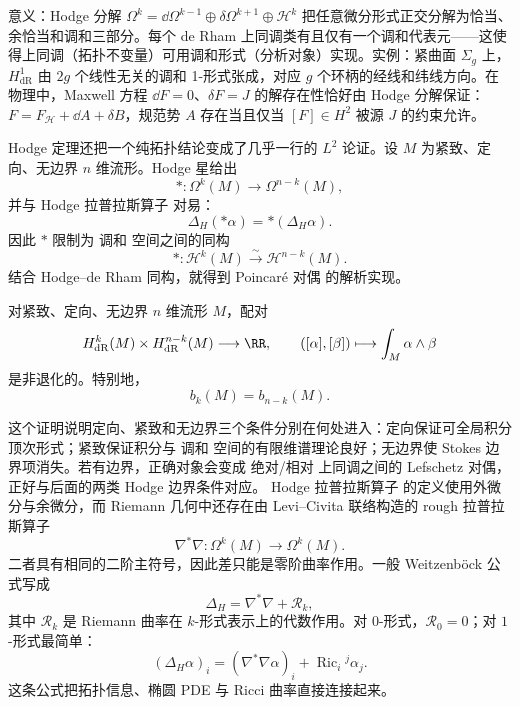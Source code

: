 意义：Hodge 分解 $\Omega^k=\dd\Omega^{k-1}\oplus\delta\Omega^{k+1}\oplus\mathcal H^k$ 把任意微分形式正交分解为恰当、余恰当和调和三部分。每个 de Rham 上同调类有且仅有一个调和代表元——这使得上同调（拓扑不变量）可用调和形式（分析对象）实现。实例：紧曲面 $\Sigma_g$ 上，$H^1_{\mathrm{dR}}$ 由 $2g$ 个线性无关的调和 1-形式张成，对应 $g$ 个环柄的经线和纬线方向。在物理中，Maxwell 方程 $\dd F=0$、$\delta F=J$ 的解存在性恰好由 Hodge 分解保证：$F=F_{\mathcal H}+\dd A+\delta B$，规范势 $A$ 存在当且仅当 $[F]\in H^2$ 被源 $J$ 的约束允许。

Hodge 定理还把一个纯拓扑结论变成了几乎一行的 $L^2$ 论证。设 $M$ 为紧致、定向、无边界 $n$ 维流形。Hodge 星给出
\[
*:\Omega^k(M)\longrightarrow\Omega^{n-k}(M),
\]
并与 Hodge 拉普拉斯算子 对易：
\[
\Delta_H(*\alpha)=*(\Delta_H\alpha).
\]
因此 $*$ 限制为 调和 空间之间的同构
\begin{equation}
*:\mathcal H^k(M)\overset{\sim}{\longrightarrow}\mathcal H^{n-k}(M).
\label{eq:math-dg-hodge-star-harmonic-isomorphism}
\end{equation}
结合 Hodge--de Rham 同构，就得到 Poincaré 对偶 的解析实现。

\begin{theorem}\label{thm:math-dg-poincare-duality-hodge}
对紧致、定向、无边界 $n$ 维流形 $M$，配对
\begin{equation}
H^k_{\mathrm{dR}}(M)\times H^{n-k}_{\mathrm{dR}}(M)
\longrightarrow\RR,
\qquad
([\alpha],[\beta])\longmapsto\int_M\alpha\wedge\beta
\label{eq:math-dg-poincare-pairing}
\end{equation}
是非退化的。特别地，
\[
b_k(M)=b_{n-k}(M).
\]
\end{theorem}

这个证明说明定向、紧致和无边界三个条件分别在何处进入：定向保证可全局积分顶次形式；紧致保证积分与 调和 空间的有限维谱理论良好；无边界使 Stokes 边界项消失。若有边界，正确对象会变成 绝对/相对 上同调之间的 Lefschetz 对偶，正好与后面的两类 Hodge 边界条件对应。
Hodge 拉普拉斯算子 的定义使用外微分与余微分，而 Riemann 几何中还存在由 Levi--Civita 联络构造的 rough 拉普拉斯算子
\[
\nabla^*\nabla:
\Omega^k(M)\to\Omega^k(M).
\]
二者具有相同的二阶主符号，因此差只能是零阶曲率作用。一般 Weitzenböck 公式写成
\begin{equation*}\boxed{
\Delta_H
=\nabla^*\nabla+\mathcal R_k
},\end{equation*}
其中 $\mathcal R_k$ 是 Riemann 曲率在 $k$-形式表示上的代数作用。对 $0$-形式，$\mathcal R_0=0$；对 $1$-形式最简单：
\begin{equation}
\boxed{
(\Delta_H\alpha)_i
=(\nabla^*\nabla\alpha)_i
+\operatorname{Ric}_i{}^j\alpha_j
}.
\label{eq:math-dg-weitzenbock-oneform}
\end{equation}
这条公式把拓扑信息、椭圆 PDE 与 Ricci 曲率直接连接起来。

